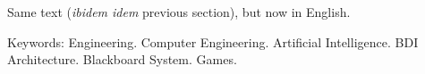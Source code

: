 
Same text (\emph{ibidem idem} previous section), but now in English.

Keywords: Engineering. Computer Engineering. Artificial
Intelligence. BDI Architecture. Blackboard System. Games.
